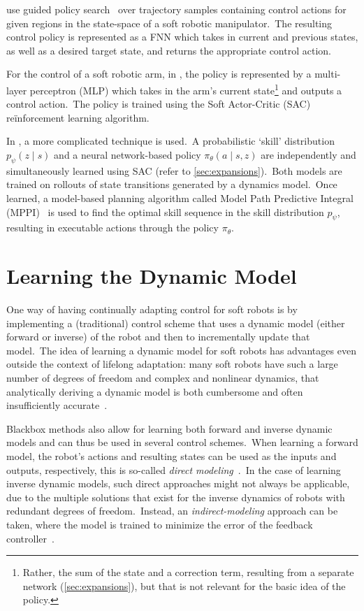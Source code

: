 \textcite{Thuruthel2019} use guided policy search~\cite{Levine2013} over trajectory samples containing control actions for given regions in the state-space of a soft robotic manipulator.\ The resulting control policy is represented as a FNN which takes in current and previous states, as well as a desired target state, and returns the appropriate control action.

For the control of a soft robotic arm, in \textcite{Nazeer2023}, the policy is represented by a multi-layer perceptron (MLP) which takes in the arm's current state\footnote{Rather, the sum of the state and a correction term, resulting from a separate network (\cref{sec:expansions}), but that is not relevant for the basic idea of the policy.} and outputs a control action.\ The policy is trained using the Soft Actor-Critic (SAC)~\cite{Haarnoja2018} reïnforcement learning algorithm.

In \textcite{Lu2020}, a more complicated technique is used.\ A probabilistic `skill' distribution $p_{\psi}(z\mid s)$ and a neural network-based policy $\pi_{\theta}(a\mid s, z)$ are independently and simultaneously learned using SAC (refer to \cref{sec:expansions}).\ Both models are trained on rollouts of state transitions generated by a dynamics model.\ Once learned, a model-based planning algorithm called Model Path Predictive Integral (MPPI)~\cite{Williams2015} is used to find the optimal skill sequence in the skill distribution $p_{\psi}$, resulting in executable actions through the policy $\pi_{\theta}$.


\section{Learning the Dynamic Model}\label{sec:DM}
One way of having continually adapting control for soft robots is by implementing a (traditional) control scheme that uses a dynamic model (either forward or inverse) of the robot and then to incrementally update that model.\ The idea of learning a dynamic model for soft robots has advantages even outside the context of lifelong adaptation: many soft robots have such a large number of degrees of freedom and complex and nonlinear dynamics, that analytically deriving a dynamic model is both cumbersome and often insufficiently accurate~\cite{Kim2021, Thuruthel2019, Giorelli2015, Gillespie2018}.

Blackbox methods also allow for learning both forward and inverse dynamic models  and can thus be used in several control schemes.\ When learning a forward model, the robot's actions and resulting states can be used as the inputs and outputs, respectively, this is so-called \emph{direct modeling}~\cite[]{Nguyen-Tuong2011}.\ In the case of learning inverse dynamic models, such direct approaches might not always be applicable, due to the multiple solutions that exist for the inverse dynamics of robots with redundant degrees of freedom.\ Instead, an \emph{indirect-modeling} approach can be taken, where the model is trained to minimize the error of the feedback controller~\cite{Nguyen-Tuong2011}.

